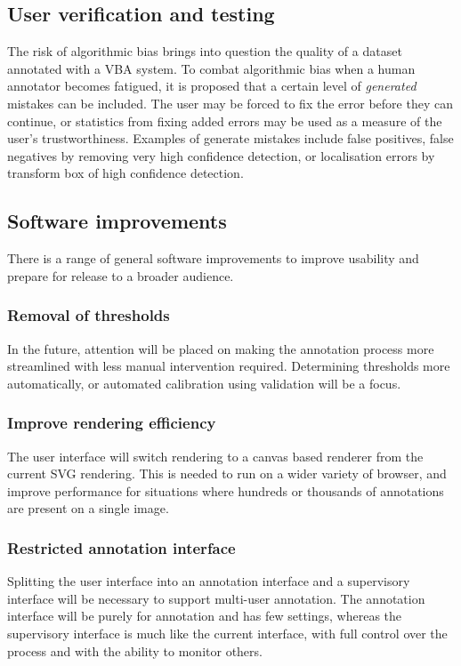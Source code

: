 \subsection{User verification and testing}
\label{sec:user_verification}

The risk of algorithmic bias brings into question the quality of a dataset annotated with a \gls{VBA} system.  To combat algorithmic bias when a human annotator becomes fatigued, it is proposed that a certain level of \emph{generated} mistakes can be included. The user may be forced to fix the error before they can continue, or statistics from fixing added errors may be used as a measure of the user's trustworthiness. Examples of generate mistakes include false positives, false negatives by removing very high confidence detection, or localisation errors by transform box of high confidence detection. 


\subsection{Software improvements}

There is a range of general software improvements to improve usability and prepare for release to a broader audience. 

\subsubsection {Removal of thresholds}
In the future, attention will be placed on making the annotation process more streamlined with less manual intervention required. Determining thresholds more automatically, or automated calibration using validation will be a focus.

\subsubsection {Improve rendering efficiency}
The user interface will switch rendering to a canvas based renderer from the current SVG rendering. This is needed to run on a wider variety of browser, and improve performance for situations where hundreds or thousands of annotations are present on a single image.

\subsubsection {Restricted annotation interface}
Splitting the user interface into an annotation interface and a supervisory interface will be necessary to support multi-user annotation. The annotation interface will be purely for annotation and has few settings, whereas the supervisory interface is much like the current interface, with full control over the process and with the ability to monitor others.

